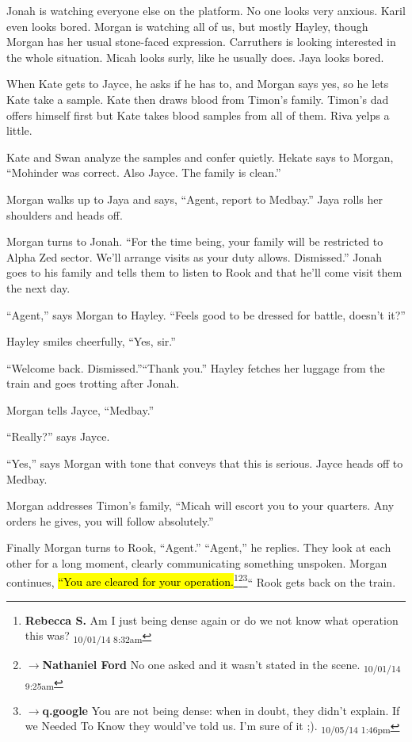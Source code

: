 Jonah is watching everyone else on the platform.  No one looks very anxious.  Karil even looks bored.  Morgan is watching all of us, but mostly Hayley, though Morgan has her usual stone-faced expression.  Carruthers is looking interested in the whole situation.  Micah looks surly, like he usually does.  Jaya looks bored.  



When Kate gets to Jayce, he asks if he has to, and Morgan says yes, so he lets Kate take a sample.  Kate then draws blood from Timon's family.  Timon's dad offers himself first but Kate takes blood samples from all of them.  Riva yelps a little.



Kate and Swan analyze the samples and confer quietly.  Hekate says to Morgan, ``Mohinder was correct. Also Jayce. The family is clean.''  



Morgan walks up to Jaya and says, ``Agent, report to Medbay.''  Jaya rolls her shoulders and heads off.

Morgan turns to Jonah. ``For the time being, your family will be restricted to Alpha Zed sector.  We'll arrange visits as your duty allows.  Dismissed.''  Jonah goes to his family and tells them to listen to Rook and that he'll come visit them the next day.

``Agent,'' says Morgan to Hayley. ``Feels good to be dressed for battle, doesn't it?''

Hayley smiles cheerfully, ``Yes, sir.''

``Welcome back.  Dismissed.''``Thank you.''  Hayley fetches her luggage from the train and goes trotting after Jonah.

Morgan tells Jayce, ``Medbay.''

``Really?'' says Jayce.

``Yes,'' says Morgan with tone that conveys that this is serious.  Jayce heads off to Medbay.

Morgan addresses Timon's family, ``Micah will escort you to your quarters.  Any orders he gives, you will follow absolutely.''

Finally Morgan turns to Rook, ``Agent.''  ``Agent,'' he replies.  They look at each other for a long moment, clearly communicating something unspoken.  Morgan continues, \hl{``You are cleared for your operation.}\footnote{\textbf{Rebecca S. }Am I just being dense again or do we not know what operation this was? \textsubscript{10/01/14 8:32am}}\footnote{$\rightarrow$\textbf{Nathaniel Ford }No one asked and it wasn't stated in the scene. \textsubscript{10/01/14 9:25am}}\footnote{$\rightarrow$\textbf{q.google }You are not being dense: when in doubt, they didn't explain.  If we Needed To Know they would've told us.  I'm sure of it ;). \textsubscript{10/05/14 1:46pm}}``  Rook gets back on the train.

